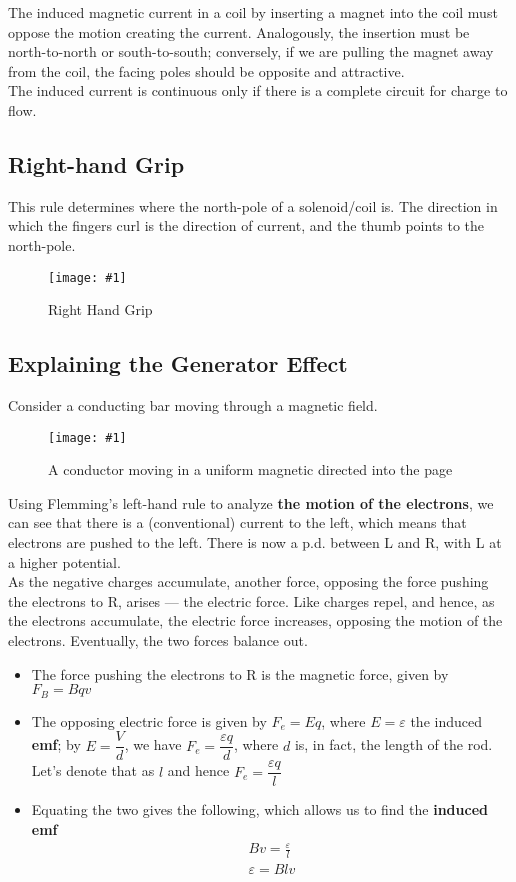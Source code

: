 \documentclass[a4paper,12pt]{article}
\newcommand{\lb}{\\[8pt]}
\newcommand{\img}[4]{\begin{center}
  \begin{figure}[H]
    \centering
    \texttt{[image: \#1]}
    \caption{#3}
    \label{fig:#4}
  \end{figure}
\end{center}}
\begin{document}
The induced magnetic current in a coil by inserting a magnet into the coil must oppose the motion creating the current. Analogously, the insertion must be north-to-north or south-to-south; conversely, if we are pulling the magnet away from the coil, the facing poles should be opposite and attractive.\lb
The induced current is continuous only if there is a complete circuit for charge to flow.

\subsection{Right-hand Grip}

This rule determines where the north-pole of a solenoid/coil is. The direction in which the fingers curl is the direction of current, and the thumb points to the north-pole.

\img{righthandgrip.jpg}{0.65}{Right Hand Grip}{rhgrip}

\subsection{Explaining the Generator Effect}

Consider a conducting bar moving through a magnetic field.
\img{bar.png}{0.6}{A conductor moving in a uniform magnetic directed into the page}{bar}
Using Flemming's left-hand rule to analyze \textbf{the motion of the electrons}, we can see that there is a (conventional) current to the left, which means that electrons are pushed to the left. There is now a p.d. between L and R, with L at a higher potential.\lb
As the negative charges accumulate, another force, opposing the force pushing the electrons to R, arises --- the electric force. Like charges repel, and hence, as the electrons accumulate, the electric force increases, opposing the motion of the electrons. Eventually, the two forces balance out.
\begin{itemize}
  \item The force pushing the electrons to R is the magnetic force, given by $F_B = Bqv$
  \item The opposing electric force is given by $F_e = Eq$, where $E = \varepsilon$ the induced \textbf{emf}; by $E = \dfrac{V}{d}$, we have $F_e = \dfrac{\varepsilon q}{d}$, where $d$ is, in fact, the length of the rod. Let's denote that as $l$ and hence $F_e = \dfrac{\varepsilon q}{l}$
  \item Equating the two gives the following, which allows us to find the \textbf{induced emf}
        \begin{align*}
          Bv = \frac{\varepsilon}{l} \\
          \varepsilon = Blv
        \end{align*}
\end{itemize}
\end{document}
